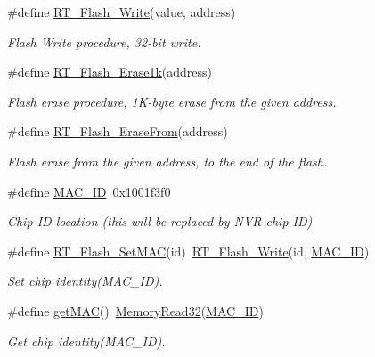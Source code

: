 \begin{DoxyCompactItemize}
\item 
\#define \mbox{\hyperlink{a00008_a13fb43316f72b3b1b9467a91fca08d5c}{R\+T\+\_\+\+Flash\+\_\+\+Write}}(value,  address)
\begin{DoxyCompactList}\small\item\em Flash Write procedure, 32-\/bit write. \end{DoxyCompactList}\item 
\#define \mbox{\hyperlink{a00008_ab65db3c66c91da3a934540a2f8175803}{R\+T\+\_\+\+Flash\+\_\+\+Erase1k}}(address)
\begin{DoxyCompactList}\small\item\em Flash erase procedure, 1\+K-\/byte erase from the given address. \end{DoxyCompactList}\item 
\#define \mbox{\hyperlink{a00008_afb9cdf54d7254cfef685cd4012113b27}{R\+T\+\_\+\+Flash\+\_\+\+Erase\+From}}(address)
\begin{DoxyCompactList}\small\item\em Flash erase from the given address, to the end of the flash. \end{DoxyCompactList}\item 
\#define \mbox{\hyperlink{a00008_aca69c626499ce2e479703cc526dba84d}{M\+A\+C\+\_\+\+ID}}~0x1001f3f0
\begin{DoxyCompactList}\small\item\em Chip ID location (this will be replaced by N\+VR chip ID) \end{DoxyCompactList}\item 
\mbox{\label{a00008_a99ec94a33a9126a436139061d9e0136b}} 
\#define \mbox{\hyperlink{a00008_a99ec94a33a9126a436139061d9e0136b}{R\+T\+\_\+\+Flash\+\_\+\+Set\+M\+AC}}(id)~\mbox{\hyperlink{a00008_a13fb43316f72b3b1b9467a91fca08d5c}{R\+T\+\_\+\+Flash\+\_\+\+Write}}(id, \mbox{\hyperlink{a00008_aca69c626499ce2e479703cc526dba84d}{M\+A\+C\+\_\+\+ID}})
\begin{DoxyCompactList}\small\item\em Set chip identity(\+M\+A\+C\+\_\+\+I\+D). \end{DoxyCompactList}\item 
\mbox{\label{a00008_ad271967795fc89594428deff626aace9}} 
\#define \mbox{\hyperlink{a00008_ad271967795fc89594428deff626aace9}{get\+M\+AC}}()~\mbox{\hyperlink{a00020_a2d484dc15bdf30ee11ab3b05f31f0e16}{Memory\+Read32}}(\mbox{\hyperlink{a00008_aca69c626499ce2e479703cc526dba84d}{M\+A\+C\+\_\+\+ID}})
\begin{DoxyCompactList}\small\item\em Get chip identity(\+M\+A\+C\+\_\+\+I\+D). \end{DoxyCompactList}\end{DoxyCompactItemize}


